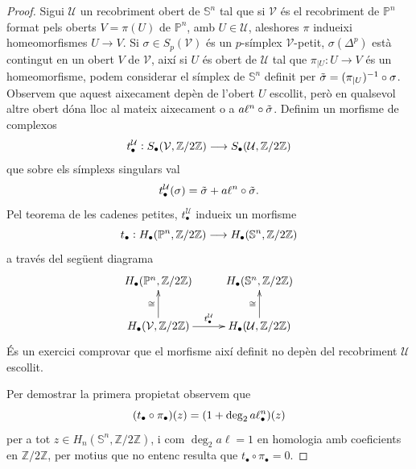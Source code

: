 \documentclass[../main.tex]{subfiles}
\begin{document}
\begin{proof}
Sigui $\mathcal{U}$ un recobriment obert de $\mathbb{S}^n$ tal que si $\mathcal{V}$ és el recobriment de $\mathbb{P}^n$ format pels oberts $V = \pi(U)$ de $\mathbb{P}^n$, amb $U\in\mathcal{U}$, aleshores $\pi$ indueixi homeomorfismes $U\rightarrow V$. Si $\sigma\in S_p(\mathcal{V})$ és un $p$-símplex $\mathcal{V}$-petit, $\sigma(\Delta^p)$ està contingut en un obert $V$ de $\mathcal{V}$, així si $U$ és obert de $\mathcal{U}$ tal que $\pi_{|U}:U\rightarrow V$ és un homeomorfisme, podem considerar el símplex de $\mathbb{S}^n$ definit per $\Tilde{\sigma} = (\pi_{|U})^{-1}\circ\sigma$. Observem que aquest aixecament depèn de l'obert $U$ escollit, però en qualsevol altre obert dóna lloc al mateix aixecament o a $a\ell^n\circ\Tilde{\sigma}$. Definim un morfisme de complexos
\begin{equation}
    \notag
    t_\bullet^{\mathcal{U}}:S_\bullet(\mathcal{V},\mathbb{Z}/2\mathbb{Z})\longrightarrow S_\bullet(\mathcal{U},\mathbb{Z}/2\mathbb{Z})
\end{equation}
que sobre els símplexs singulars val
\begin{equation}
    \notag
    t_\bullet^{\mathcal{U}}(\sigma) = \Tilde{\sigma}+a\ell^n\circ\Tilde{\sigma}.
\end{equation}
Pel teorema de les cadenes petites, $t_\bullet^{\mathcal{U}}$ indueix un morfisme
\begin{equation}
    \notag
    t_\bullet:H_\bullet(\mathbb{P}^n,\mathbb{Z}/2\mathbb{Z})\longrightarrow H_\bullet(\mathbb{S}^n,\mathbb{Z}/2\mathbb{Z})
\end{equation}
a través del següent diagrama
\begin{equation}
    \notag
    \xymatrix{
    H_\bullet(\mathbb{P}^n,\mathbb{Z}/2\mathbb{Z}) & H_\bullet(\mathbb{S}^n,\mathbb{Z}/2\mathbb{Z})\\
    H_\bullet(\mathcal{V},\mathbb{Z}/2\mathbb{Z})\ar[u]^{\cong}\ar[r]^{t_\bullet^{\mathcal{U}}} & H_\bullet(\mathcal{U},\mathbb{Z}/2\mathbb{Z})\ar[u]^{\cong}
    }
\end{equation}
És un exercici comprovar que el morfisme així definit no depèn del recobriment $\mathcal{U}$ escollit.

Per demostrar la primera propietat observem que 
\begin{equation}
    \notag
    (t_\bullet\circ\pi_\bullet)(z) = (1+\deg_2a\ell^n_\bullet)(z)
\end{equation}
per a tot $z\in H_n(\mathbb{S}^n,\mathbb{Z}/2\mathbb{Z})$, i com $\deg_2a\ell = 1$ en homologia amb coeficients en $\mathbb{Z}/2\mathbb{Z}$, per motius que no entenc resulta que $t_\bullet\circ\pi_\bullet = 0$.


\end{proof}
\end{document}
